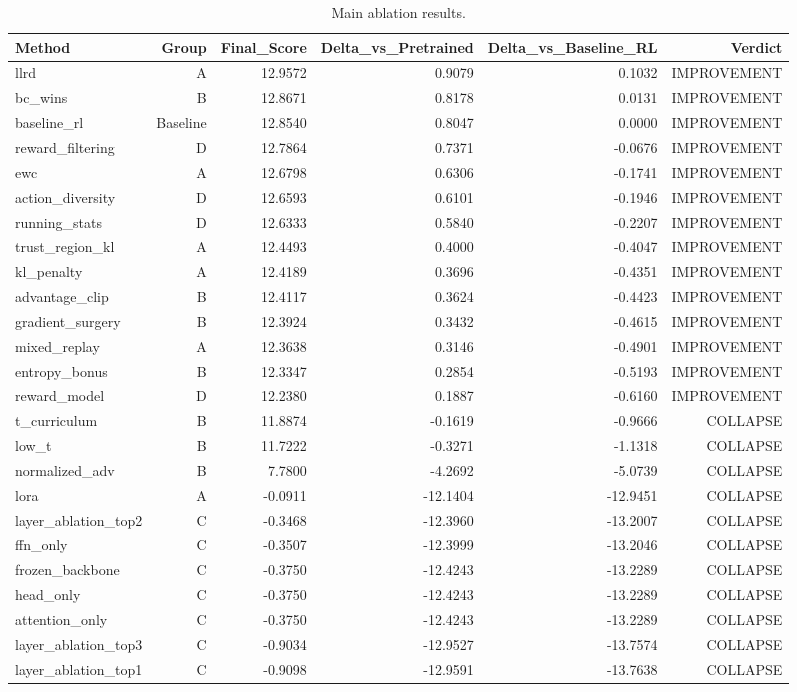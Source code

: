 \begin{table}[htbp]
\centering
\caption{Main ablation results.}
\label{tab:main_results}
\begin{tabular}{lrrrrr}
\toprule
\textbf{Method} & \textbf{Group} & \textbf{Final_Score} & \textbf{Delta_vs_Pretrained} & \textbf{Delta_vs_Baseline_RL} & \textbf{Verdict} \\
\midrule
llrd & A & 12.9572 & 0.9079 & 0.1032 & IMPROVEMENT \\
bc_wins & B & 12.8671 & 0.8178 & 0.0131 & IMPROVEMENT \\
baseline_rl & Baseline & 12.8540 & 0.8047 & 0.0000 & IMPROVEMENT \\
reward_filtering & D & 12.7864 & 0.7371 & -0.0676 & IMPROVEMENT \\
ewc & A & 12.6798 & 0.6306 & -0.1741 & IMPROVEMENT \\
action_diversity & D & 12.6593 & 0.6101 & -0.1946 & IMPROVEMENT \\
running_stats & D & 12.6333 & 0.5840 & -0.2207 & IMPROVEMENT \\
trust_region_kl & A & 12.4493 & 0.4000 & -0.4047 & IMPROVEMENT \\
kl_penalty & A & 12.4189 & 0.3696 & -0.4351 & IMPROVEMENT \\
advantage_clip & B & 12.4117 & 0.3624 & -0.4423 & IMPROVEMENT \\
gradient_surgery & B & 12.3924 & 0.3432 & -0.4615 & IMPROVEMENT \\
mixed_replay & A & 12.3638 & 0.3146 & -0.4901 & IMPROVEMENT \\
entropy_bonus & B & 12.3347 & 0.2854 & -0.5193 & IMPROVEMENT \\
reward_model & D & 12.2380 & 0.1887 & -0.6160 & IMPROVEMENT \\
t_curriculum & B & 11.8874 & -0.1619 & -0.9666 & COLLAPSE \\
low_t & B & 11.7222 & -0.3271 & -1.1318 & COLLAPSE \\
normalized_adv & B & 7.7800 & -4.2692 & -5.0739 & COLLAPSE \\
lora & A & -0.0911 & -12.1404 & -12.9451 & COLLAPSE \\
layer_ablation_top2 & C & -0.3468 & -12.3960 & -13.2007 & COLLAPSE \\
ffn_only & C & -0.3507 & -12.3999 & -13.2046 & COLLAPSE \\
frozen_backbone & C & -0.3750 & -12.4243 & -13.2289 & COLLAPSE \\
head_only & C & -0.3750 & -12.4243 & -13.2289 & COLLAPSE \\
attention_only & C & -0.3750 & -12.4243 & -13.2289 & COLLAPSE \\
layer_ablation_top3 & C & -0.9034 & -12.9527 & -13.7574 & COLLAPSE \\
layer_ablation_top1 & C & -0.9098 & -12.9591 & -13.7638 & COLLAPSE \\
\bottomrule
\end{tabular}
\end{table}